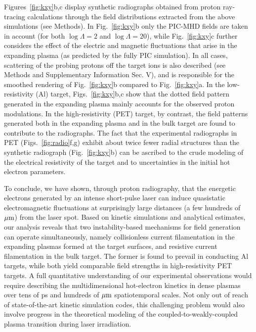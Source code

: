 \documentclass[aps,twocolumn,showpacs,superscriptaddress]{revtex4}
\begin{document}
Figures~\ref{fig:kxy}b,c display synthetic radiographs obtained from proton ray-tracing calculations through the field distributions extracted from the above simulations (see Methods). In Fig.~\ref{fig:kxy}b only the PIC-MHD fields are taken in account (for both $\log \Lambda =2$ and $\log \Lambda = 20$), while Fig.~\ref{fig:kxy}c further considers the effect of the electric and magnetic fluctuations that arise in the expanding plasma (as predicted by the fully PIC simulation). In all cases, scattering of the probing protons off the target ions is also described (see Methods and Supplementary Information Sec. V), and is responsible for the smoothed rendering of Fig.~\ref{fig:kxy}b compared to Fig.~\ref{fig:kxy}a. In the low-resistivity (Al) target,  Figs.~\ref{fig:kxy}b,c show that the dotted field pattern generated in the expanding plasma mainly accounts for the observed proton modulations. In the high-resistivity (PET) target, by contrast, the field patterns generated both in the expanding plasma and in the bulk target are found to contribute to the radiographs. The fact that
the experimental radiographs in PET (Figs.~\ref{fig:radio}f,g) exhibit about twice fewer radial structures than the synthetic radiograph (Fig.~\ref{fig:kxy}b) can be ascribed to the crude modeling of the electrical resistivity of the target and to uncertainties in the initial hot electron parameters.

To conclude, we have shown, through proton radiography, that the energetic electrons generated by an intense short-pulse laser can induce quasistatic electromagnetic fluctuations at surprisingly large distances (a few hundreds of $\rm \mu m$) from the laser spot. Based on kinetic simulations and analytical estimates, our analysis reveals that two instability-based mechanisms for field generation can operate simultaneously, namely collisionless current filamentation in the expanding plasmas formed at the target surfaces, and resistive current filamentation in the bulk target. The former is found to prevail in conducting Al targets, while both yield comparable field strengths in high-resistivity PET targets. A full quantitative understanding of our experimental observations would require describing the multidimensional hot-electron kinetics in dense plasmas over tens of ps and hundreds of $\rm \mu m$ spatiotemporal scales. Not only out of reach of state-of-the-art kinetic simulation codes, this challenging problem would also involve progress in the theoretical modeling of the coupled-to-weakly-coupled plasma transition during laser irradiation.
\end{document}
